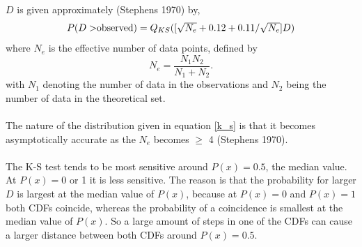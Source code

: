$D$ is given approximately (Stephens 1970) by,
\begin{equation}
    P(D>$observed$)=Q_{KS}([\sqrt{N_e}+0.12+0.11/\sqrt{N_e}]D)
\end{equation}
where $N_e$ is the effective number of data points, defined by
\begin{equation}
    N_e=\frac{N_1N_2}{N_1+N_2}.
\end{equation}
with $N_1$ denoting the number of data in the observations and
$N_2$ being the number of data in the theoretical set.\\\\
The nature of the distribution given in equation \eqref{k_s} is that it
becomes asymptotically accurate as the $N_e$ becomes $\geq$ 4
(Stephens 1970).\\\\
The K-S test tends to be most sensitive around $P(x)=0.5$, the
median value. At $P(x)=0$ or 1 it is less sensitive. The reason is
that the probability for larger $D$ is largest at the median value
of $P(x)$, because at $P(x)=0$ and $P(x)=1$ both CDFs coincide,
whereas the probability of a coincidence is smallest at the median
value of $P(x)$. So a large amount of steps in one of the CDFs can
cause a larger distance between both CDFs around $P(x)=0.5$.\\\\
